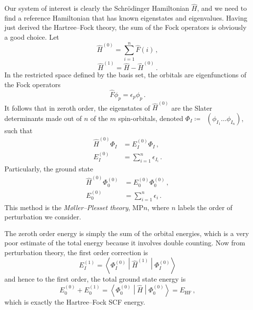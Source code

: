\documentclass{article}
\theoremstyle{plain}\theoremheaderfont{\normalfont\itshape}\theorembodyfont{\rmfamily}\theoremseparator{.}\newtheorem*{rem}{Remark}\newtheorem*{ex}{Example}\newtheorem*{proof}{Proof}\newtheorem*{altp}{Alternative proof}
\theoremstyle{plain}\theoremheaderfont{\normalfont\bfseries}\theorembodyfont{\rmfamily}\theoremseparator{.}\newtheorem{thm}{Theorem}[section]\newtheorem{lem}[thm]{Lemma}\newtheorem{prop}[thm]{Proposition}\newtheorem*{cor}{Corollary}\newtheorem{defn}[thm]{Definition}\newtheorem{clm}[thm]{Claim}\newtheorem{clminproof}{Claim}
\theoremstyle{break}\theoremheaderfont{\normalfont\itshape}\theorembodyfont{\rmfamily}\theoremseparator{.\medskip}\newtheorem*{proofskip}{Proof}\newtheorem*{exs}{Examples}\newtheorem*{rems}{Remarks}
\theoremstyle{break}\theoremheaderfont{\normalfont\bfseries}\theorembodyfont{\rmfamily}\theoremseparator{.\medskip}\newtheorem{lemskip}[thm]{Lemma}\newtheorem{defnskip}[thm]{Definition}\newtheorem{propskip}[thm]{Proposition}\newtheorem{thmskip}[thm]{Theorem}
\numberwithin{equation}{section}
\newcommand{\expval}[2]{\left\langle #2 \middle| #1 \middle| #2 \right\rangle}
\DeclareMathOperator{\antisymm}{\hat{\mathcal{A}}}
\begin{document}
    Our system of interest is clearly the Schr\"{o}dinger Hamiltonian \(\hat{H}\), and we need to find a reference Hamiltonian that has known eigenstates and eigenvalues. Having just derived the Hartree--Fock theory, the sum of the Fock operators is obviously a good choice. Let
    \begin{equation}
        \hat{H}^{(0)}=\sum_{i=1}^{n}\hat{F}(i)\,,
    \end{equation}
    \begin{equation}
        \hat{H}^{(1)}=\hat{H}-\hat{H}^{(0)}\,.
    \end{equation}
    In the restricted space defined by the basis set, the orbitals are eigenfunctions of the Fock operators
    \begin{equation}
        \hat{F}\phi_p=\epsilon_p\phi_p\,.
    \end{equation}
    It follows that in zeroth order, the eigenstates of \(\hat{H}^{(0)}\) are the Slater determinants made out of \(n\) of the \(m\) spin-orbitals, denoted \(\Phi_I\coloneqq\antisymm(\phi_{I_1}\dots\phi_{I_n})\), such that
    \begin{align}
        \hat{H}^{(0)}\Phi_I&=E_I^{(0)}\Phi_I\,, \\
        E_I^{(0)}&=\sum_{i=1}^{n}\epsilon_{I_i}\,.
    \end{align}
    Particularly, the ground state
    \begin{align}
        \hat{H}^{(0)}\Phi_0^{(0)}&=E_0^{(0)}\Phi_0^{(0)}\,,\\
        E_0^{(0)}&=\sum_{i=1}^{n}\epsilon_i\,.
    \end{align}
    This method is the \textit{M\o ller--Plesset theory}, MP\(n\), where \(n\) labels the order of perturbation we consider.

    The zeroth order energy is simply the sum of the orbital energies, which is a very poor estimate of the total energy because it involves double counting. Now from perturbation theory, the first order correction is
    \begin{equation}
        E_I^{(1)}=\expval{\hat{H}^{(1)}}{\Phi_I^{(0)}}
    \end{equation}
    and hence to the first order, the total ground state energy is
    \begin{equation}
        E_0^{(0)}+E_0^{(1)}=\expval{\hat{H}}{\Phi_0^{(0)}}=E_{\text{HF}}\,,
    \end{equation}
    which is exactly the Hartree--Fock SCF energy.
\end{document}
